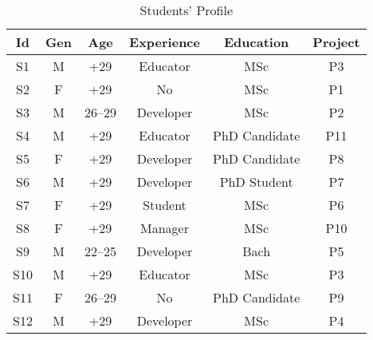 \begin{table}[thb]
    \centering
        \caption{Students' Profile}
    \label{tab:population}
    \begin{tabular}{c|c|c|c|c|c}
    \hline
        \textbf{Id} & \textbf{Gen} & \textbf{Age} & \textbf{Experience} & \textbf{Education} & \textbf{Project} \\
    \hline
        S1 & M & +29 & Educator & MSc & P3 \\
    \hline
        S2 & F & +29 & No &  MSc & P1 \\
    \hline
        S3 & M & 26--29 & Developer & MSc & P2 \\
    \hline
        S4 & M & +29 & Educator & PhD Candidate & P11 \\
    \hline
        S5 & F & +29 & Developer &  PhD Candidate & P8 \\
    \hline
        S6 & M & +29 & Developer &  PhD Student & P7 \\
    \hline
        S7 & F & +29 & Student & MSc & P6 \\
    \hline
        S8 & F & +29 & Manager & MSc & P10 \\
    \hline
        S9 & M & 22--25 & Developer & Bach & P5 \\
    \hline
        S10 & M & +29 & Educator & MSc & P3 \\
    \hline
        S11 & F & 26--29 & No & PhD Candidate & P9 \\
    \hline
        S12 & M & +29 & Developer & MSc & P4 \\
    \hline
    \end{tabular}
\end{table}